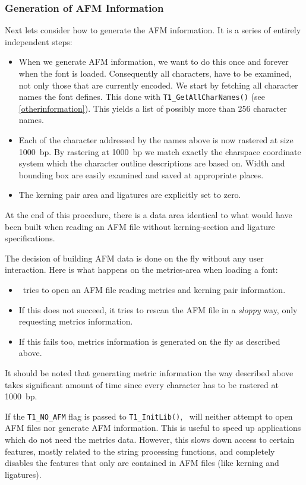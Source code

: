 \subsubsection{Generation of AFM Information}
\label{generatingafminfo}%
Next lets consider how to generate the AFM information. It is a series of
entirely independent steps:
\begin{itemize}
\item When we generate AFM information, we want to do this once and forever
  when the font is loaded. Consequently all characters, have to be examined,
  not only those that are currently encoded. 
  We start by fetching all character names the font defines. This done with
  \verb+T1_GetAllCharNames()+ (see \ref{otherinformation}). This yields a list
  of possibly more than 256 character names.
\item Each of the character addressed by the names above is now rastered at
  size 1000~bp. By rastering at 1000~bp we match exactly the charspace
  coordinate system which the character outline descriptions are
  based on. Width and bounding box are easily examined and saved at
  appropriate places. 
\item The kerning pair area and ligatures are explicitly set to zero.
\end{itemize}
At the end of this procedure, there is a data area identical to what would
have been built when reading an AFM file without kerning-section and ligature
specifications.  

The decision of building AFM data is done on the fly without any user
interaction. Here is what happens on the metrics-area when loading a font:
\begin{itemize}
\item \tonelib\ tries to open an AFM file reading metrics and kerning pair
  information. 
\item If this does not succeed, it tries to rescan the AFM file in a {\em
    sloppy} way, only requesting metrics information.
\item If this fails too, metrics information is generated on the fly as
  described above.
\end{itemize}
It should be noted that generating metric information the way described above
takes significant amount of time since every character has to be rastered at
1000~bp.

If the \verb+T1_NO_AFM+ flag is passed to \verb+T1_InitLib()+,
\tonelib\ will neither attempt to open AFM files nor generate AFM
information.  This is useful to speed up applications which do not
need the metrics data. However, this slows down access to certain features,
mostly related to the string processing functions, and completely disables the
features that only are contained in AFM files (like kerning and ligatures).

